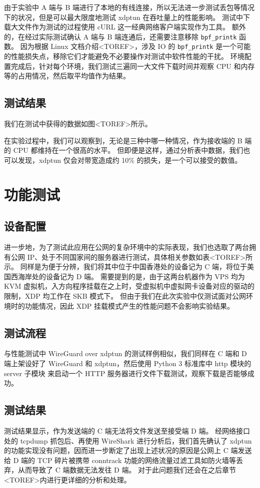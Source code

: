 由于实验中 A 端与 B 端进行了本地的有线连接，所以无法进一步测试丢包等情况下的状况，但是可以最大限度地测试 xdptun 在吞吐量上的性能影响。
测试中下载大文件作为测试的过程使用 cURL 这一经典网络客户端实现作为工具。
额外的，在经过实际测试确认 A 端与 B 端连通后，还需要注意移除 \texttt{bpf\_printk} 函数。
因为根据 Linux 文档介绍<TOREF>，涉及 IO 的 \texttt{bpf\_printk} 是一个可能的性能损失点，移除它们才能避免不必要操作对测试中软件性能的干扰。
环境配置完成后，针对每个环境，我们测试三遍同一大文件下载时间并观察 CPU 和内存等的占用情况，然后取平均值作为结果。

\subsection{测试结果}

我们在测试中获得的数据如图<TOREF>所示。

在实验过程中，我们可以观察到，无论是三种中哪一种情况，作为接收端的 B 端的 CPU 都维持在一个很高的水平。
但即便是这样，通过分析表中数据，我们也可以发现，xdptun 仅会对带宽造成约 10\% 的损失，是一个可以接受的数值。

\section{功能测试}

\subsection{设备配置}

进一步地，为了测试此应用在公网的复杂环境中的实际表现，我们也选取了两台拥有公网 IP、处于不同国家间的服务器进行测试，具体相关参数如表<TOREF>所示。
同样是为便于分辨，我们将其中位于中国香港处的设备记为 C 端，将位于美国西海岸处的设备记为 D 端。
需要提到的是，由于这两台机器作为 VPS 均为 KVM 虚拟机，入方向程序挂载在之上时，受虚拟机中虚拟网卡设备对应的驱动的限制，XDP 均工作在 SKB 模式下。
但由于我们在此次实验中仅测试面对公网环境时的功能情况，因此 XDP 挂载模式产生的性能问题不会影响实验结果。

\subsection{测试流程}

与性能测试中 WireGuard over xdptun 的测试样例相似，我们同样在 C 端和 D 端上架设好了 WireGuard 和 xdptun，然后使用 Python 3 标准库中 http 模块的 server 子模块 来启动一个 HTTP 服务器进行文件下载测试，观察下载是否能够成功。

\subsection{测试结果}

测试结果显示，作为发送端的 C 端无法将文件发送至接受端 D 端。
经网络接口处的 tcpdump 抓包后、再使用 WireShark 进行分析后，我们首先确认了 xdptun 的功能实现没有问题，因而进一步断定了出现上述状况的原因是公网上 C 端发送给 D 端的 TCP 碎片被携带 conntrack 功能的网络流量过滤工具如防火墙等丢弃，从而导致了 C 端数据无法发往 D 端。
对于此问题我们还会在之后章节<TOREF>内进行更详细的分析和处理。
